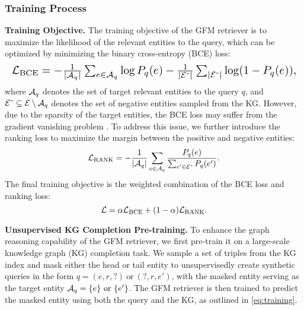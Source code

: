 \subsubsection{Training Process}\label{sec:training}

\noindent\textbf{Training Objective.} The training objective of the GFM retriever is to maximize the likelihood of the relevant entities to the query, which can be optimized by minimizing the binary cross-entropy (BCE) loss:
\begin{equation}
    \setlength\abovedisplayskip{3pt}%
    \setlength\belowdisplayskip{3pt}
    \resizebox{1\columnwidth}{!}{$
    \gL_{\text{BCE}} = -\frac{1}{|\gA_q|}\sum_{e\in\gA_q} \log P_q(e) - \frac{1}{|\gE^{\texttt{-}}|}\sum_{|\gE^{\texttt{-}}|} \log (1-P_q(e)), $}
\end{equation}
where ${\mathcal{A}}_q$ denotes the set of target relevant entities to the query $q$, and ${\mathcal{E}}^{\texttt{-}}\subseteq {\mathcal{E}}\setminus {\mathcal{A}}_q$ denotes the set of negative entities sampled from the KG. However, due to the sparsity of the target entities, the BCE loss may suffer from the gradient vanishing problem \cite{lin2024understanding}. To address this issue, we further introduce the ranking loss \cite{bai2023regression} to maximize the margin between the positive and negative entities:
\begin{equation}
    \setlength\abovedisplayskip{2pt}%
    \setlength\belowdisplayskip{2pt}
    \gL_{\text{RANK}} = - \frac{1}{|\gA_q|}\sum_{e\in\gA_q} \frac{P_q(e)}{\sum_{e'\in\gE^{\texttt{-}}} P_q(e')}.
\end{equation}
The final training objective is the weighted combination of the BCE loss and ranking loss:
\begin{equation}
    \setlength\abovedisplayskip{2pt}%
    \setlength\belowdisplayskip{2pt}
    \gL = \alpha\gL_{\text{BCE}} + (1-\alpha) \gL_{\text{RANK}}.\label{eq:training}
\end{equation}

\noindent\textbf{Unsupervised KG Completion Pre-training.} To enhance the graph reasoning capability of the GFM retriever, we first pre-train it on a large-scale knowledge graph (KG) completion task. We sample a set of triples from the KG index and mask either the head or tail entity to unsupervisedly create synthetic queries in the form $q=(e,r,?)~\text{or}~(?, r, e')$, with the masked entity serving as the target entity ${\mathcal{A}}_q = \{e\}~\text{or}~\{e'\}$. The GFM retriever is then trained to predict the masked entity using both the query and the KG, as outlined in \eqref{eq:training}.

